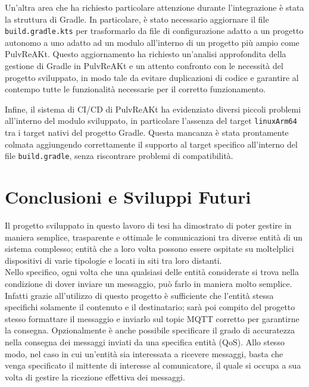 \documentclass[12pt,a4paper,openright,twoside]{book}
\begin{document}
Un'altra area che ha richiesto particolare attenzione durante l'integrazione è stata la struttura di Gradle. 
In particolare, è stato necessario aggiornare il file \texttt{build.gradle.kts} per trasformarlo da file di configurazione adatto a un progetto autonomo a uno adatto ad un 
modulo all'interno di un progetto più ampio come PulvReAKt. Questo aggiornamento ha richiesto un'analisi approfondita della gestione di Gradle in PulvReAKt e un attento confronto 
con le necessità del progetto sviluppato, in modo tale da evitare duplicazioni di codice e garantire al contempo tutte le funzionalità necessarie per il corretto funzionamento.

Infine, il sistema di \ac{CI/CD} di PulvReAKt ha evidenziato diversi piccoli problemi all'interno del modulo sviluppato,
in particolare l'assenza del target \texttt{linuxArm64} tra i target nativi del progetto Gradle. 
Questa mancanza è stata prontamente colmata aggiungendo correttamente il supporto al target specifico all'interno del file \texttt{build.gradle}, 
senza riscontrare problemi di compatibilità.

\chapter{Conclusioni e Sviluppi Futuri}\label{chap:Conclusioni}

Il progetto sviluppato in questo lavoro di tesi ha dimostrato di poter gestire in maniera semplice, trasparente e ottimale le comunicazioni tra diverse entità 
di un sistema complesso; entità che a loro volta possono essere ospitate su moltelplici dispositivi di varie tipologie e locati in siti tra loro distanti.\\
Nello specifico, ogni volta che una qualsiasi delle entità considerate si trova nella condizione di dover inviare un messaggio, può farlo in maniera molto semplice. 
Infatti grazie all'utilizzo di questo progetto è sufficiente che l'entità stessa specifichi solamente il contenuto e il destinatario; sarà poi compito del progetto 
stesso formattare il messaggio e inviarlo sul topic MQTT corretto per garantirne la consegna. 
Opzionalmente è anche possibile specificare il grado di accuratezza nella consegna dei messaggi inviati da una specifica entità (\ac{QoS}).
Allo stesso modo, nel caso in cui un'entità sia interessata a ricevere messaggi, basta che venga specificato il mittente di interesse al comunicatore, 
il quale si occupa a sua volta di gestire la ricezione effettiva dei messaggi.\\
\end{document}
